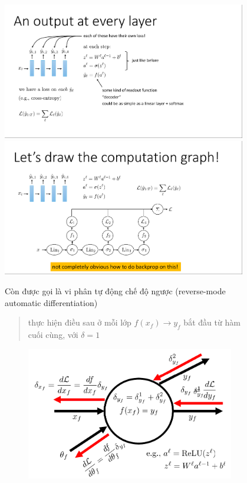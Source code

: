 \documentclass{book}
\begin{document}
\begin{figure}[H]
    \centering
    \includegraphics[width=0.95\textwidth]{images/lec10_7.png}
    \includegraphics[width=0.95\textwidth]{images/lec10_8.png}
    \begin{minipage}[c]{0.45\textwidth}
        Còn được gọi là vi phân tự động chế độ ngược (reverse-mode automatic differentiation)
        \begin{quote}
            thực hiện điều sau ở mỗi lớp $f(x_f)\to y_f$ bắt đầu từ hàm cuối cùng, với $\delta=1$
        \end{quote}
        \begin{figure}[H]
            \centering
            \includegraphics[width=\textwidth]{images/graph_structure_backpropagation.png}

\end{figure}
\end{minipage}
\end{figure}
\end{document}
